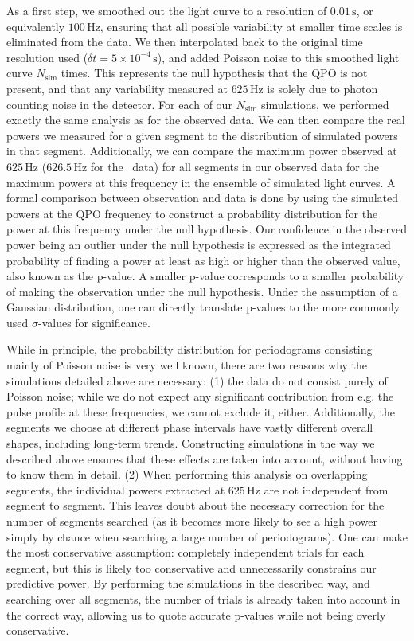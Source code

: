 \documentclass{emulateapj}
\begin{document}
As a first step, we smoothed out the light curve to a resolution of $0.01 \, \mathrm{s}$, or equivalently $100 \, \mathrm{Hz}$, ensuring that all possible variability at smaller time scales is eliminated from the data. We then interpolated back to the original time resolution used ($\delta t = 5\times10^{-4} \, \mathrm{s}$), and added Poisson noise to this smoothed light curve $N_{\mathrm{sim}}$ times. This represents the null hypothesis that the QPO is not present, and that any variability measured at $625 \, \mathrm{Hz}$ is solely due to photon counting noise in the detector. For each of our $N_{\mathrm{sim}}$ simulations, we performed exactly the same analysis as for the observed data. We can then compare the real powers we measured for a given segment to the distribution of simulated powers in that segment. Additionally, we can compare the maximum power observed at $625 \, \mathrm{Hz}$ ($626.5 \, \mathrm{Hz}$ for the \rhessi\ data) for all segments in our observed data for the maximum powers at this frequency in the ensemble of simulated light curves. A formal comparison between observation and data is done by using the simulated powers at the QPO frequency to construct a probability distribution for the power at this frequency under the null hypothesis. Our confidence in the observed power being an outlier under the null hypothesis is expressed as the integrated probability of finding a power at least as high or higher than the observed value, also known as the p-value. A smaller p-value corresponds to a smaller probability of making the observation under the null hypothesis. Under the assumption of a Gaussian distribution, one can directly translate p-values to the more commonly used $\sigma$-values for significance. 

While in principle, the probability distribution for periodograms consisting mainly of Poisson noise is very well known, there are two reasons why the simulations detailed above are necessary: (1) the data do not consist purely of Poisson noise; while we do not expect any significant contribution from e.g. the pulse profile at these frequencies, we cannot exclude it, either. Additionally, the segments we choose at different phase intervals have vastly different overall shapes, including long-term trends. Constructing simulations in the way we described above ensures that these effects are taken into account, without having to know them in detail. (2) When performing this analysis on overlapping segments, the individual powers extracted at $625 \, \mathrm{Hz}$ are not independent from segment to segment. This leaves doubt about the necessary correction for the number of segments searched (as it becomes more likely to see a high power simply by chance when searching a large number of periodograms). One can make the most conservative assumption: completely independent trials for each segment, but this is likely too conservative and unnecessarily constrains our predictive power. By performing the simulations in the described way, and searching over all segments, the number of trials is already taken into account in the correct way, allowing us to quote accurate p-values while not being overly conservative.
\end{document}
